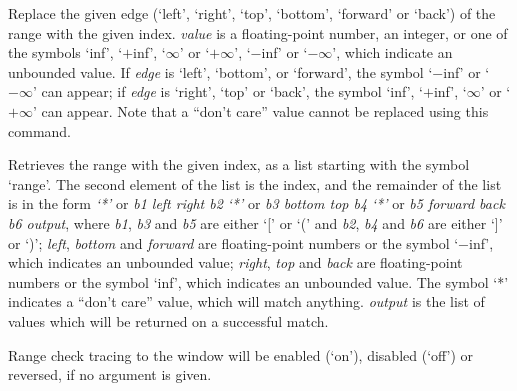   Replace the given edge (`left', `right', `top', `bottom', `forward' or `back') of the range with the
  given index.
  \emph{value} is a floating-point number, an integer, or one of the symbols `inf', `$+$inf',
  `$\infty$' or `$+\infty$', `$-$inf' or `$-\infty$', which indicate an unbounded value.
  If \emph{edge} is `left', `bottom', or `forward', the symbol `$-$inf' or `$-\infty$' can appear;
  if \emph{edge} is `right', `top' or `back', the symbol `inf', `$+$inf', `$\infty$' or `$+\infty$' can appear.
  Note that a ``don't care'' value cannot be replaced using this command.

  Retrieves the range with the given index, as a list starting with the symbol `range'.
  The second element of the list is the index, and the remainder of the list is in the form
  \emph{`*'} or \emph{b1 left right b2} \emph{`*'} or \emph{b3 bottom top b4} \emph{`*'} or \emph{b5 forward back b6 output}, where \emph{b1}, \emph{b3} and \emph{b5}
  are either `[' or `(' and \emph{b2}, \emph{b4} and \emph{b6} are either `]' or `)';
  \emph{left}, \emph{bottom} and \emph{forward} are floating-point numbers or the symbol `$-$inf',
  which indicates an unbounded value; \emph{right}, \emph{top} and \emph{back} are floating-point numbers or
  the symbol `inf', which indicates an unbounded value.
  The symbol `*' indicates a ``don't care'' value, which will match anything.
  \emph{output} is the list of values which will be returned on a successful match.

  Range check tracing to the \MaxName{} window will be enabled (`on'), disabled (`off') or reversed,
  if no argument is given.
  
  \objListCmdEnd

\objItemFile[]

